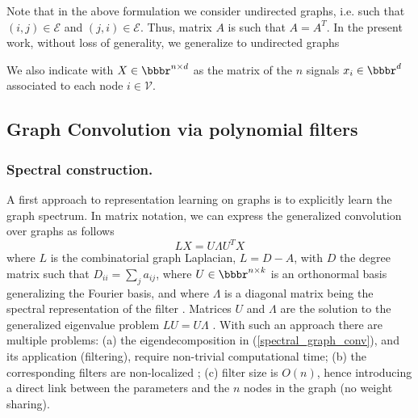\documentclass[runningheads]{llncs}
\begin{document}
Note that in the above formulation we consider undirected graphs, i.e. such that $(i,j)\in\mathcal{E}$ and $(j,i)\in\mathcal{E}$. Thus, matrix $A$ is such that $A = A^T$. In the present work, without loss of generality, we generalize to undirected graphs


We also indicate with $X \in \bbbr^{n\times d}$ as the matrix of the $n$ signals $x_i\in \bbbr^d$ associated to each node $i \in \mathcal{V}$. 

\subsection{Graph Convolution via polynomial filters}

\subsubsection{Spectral construction.}
A first approach to representation learning on graphs is to explicitly learn the graph spectrum. In matrix notation, we can express the
generalized convolution over graphs as follows \cite{DBLP:journals/corr/BronsteinBLSV16}
\begin{equation} \label{spectral_graph_conv}
	L X = U \Lambda U^T X
\end{equation}
where $L$ is the combinatorial graph Laplacian, $L = D - A$, with $D$ the degree matrix such that $D_{ii} = \sum_{j} a_{ij}$, where $U \in \bbbr^{n\times k}$ is an orthonormal basis generalizing the Fourier basis, and where $\Lambda$ is a diagonal matrix being the spectral representation of the filter \cite{Belkin:2001:LES:2980539.2980616,bruna}. Matrices $U$ and $\Lambda$ are the solution to the generalized eigenvalue problem $L U = U \Lambda$ \cite{Belkin:2001:LES:2980539.2980616,bruna}.
With such an approach there are multiple problems: (a) the eigendecomposition in (\ref{spectral_graph_conv}), and its application (filtering), require non-trivial computational time; (b) the corresponding filters are non-localized \cite{DBLP:journals/corr/DefferrardBV16}; (c) filter size is $O(n)$, hence introducing a direct link between the parameters and the $n$ nodes in the graph (no weight sharing).
\end{document}

